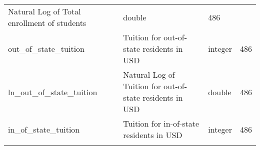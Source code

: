 \documentclass[
]{article}
\begin{document}
\begin{longtable}[]{@{}llll@{}}
\begin{minipage}[t]{0.28\columnwidth}
Natural Log of Total enrollment of students\strut
\end{minipage} & \begin{minipage}[t]{0.18\columnwidth}\raggedright
double\strut
\end{minipage} & \begin{minipage}[t]{0.23\columnwidth}\raggedright
486\strut
\end{minipage}\tabularnewline
\begin{minipage}[t]{0.19\columnwidth}\raggedright
out\_of\_state\_tuition\strut
\end{minipage} & \begin{minipage}[t]{0.28\columnwidth}\raggedright
Tuition for out-of-state residents in USD\strut
\end{minipage} & \begin{minipage}[t]{0.18\columnwidth}\raggedright
integer\strut
\end{minipage} & \begin{minipage}[t]{0.23\columnwidth}\raggedright
486\strut
\end{minipage}\tabularnewline
\begin{minipage}[t]{0.19\columnwidth}\raggedright
ln\_out\_of\_state\_tuition\strut
\end{minipage} & \begin{minipage}[t]{0.28\columnwidth}\raggedright
Natural Log of Tuition for out-of-state residents in USD\strut
\end{minipage} & \begin{minipage}[t]{0.18\columnwidth}\raggedright
double\strut
\end{minipage} & \begin{minipage}[t]{0.23\columnwidth}\raggedright
486\strut
\end{minipage}\tabularnewline
\begin{minipage}[t]{0.19\columnwidth}\raggedright
in\_of\_state\_tuition\strut
\end{minipage} & \begin{minipage}[t]{0.28\columnwidth}\raggedright
Tuition for in-of-state residents in USD\strut
\end{minipage} & \begin{minipage}[t]{0.18\columnwidth}\raggedright
integer\strut
\end{minipage} & \begin{minipage}[t]{0.23\columnwidth}\raggedright
486\strut
\end{minipage}\tabularnewline
\begin{minipage}[t]{0.19\columnwidth}\raggedright

\end{minipage}
\end{longtable}
\end{document}
